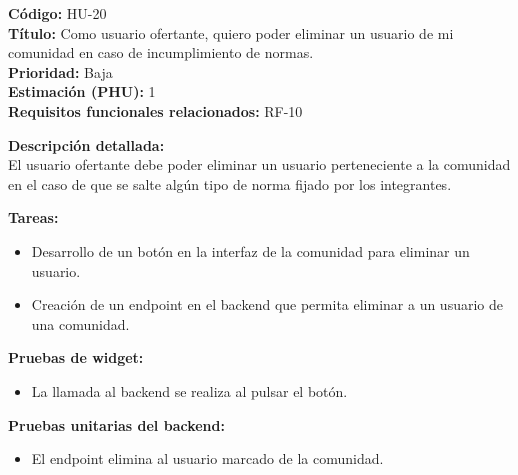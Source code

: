 \begin{tarjetaHU}
\textbf{Código:} HU-20 \\
\textbf{Título:} Como usuario ofertante, quiero poder eliminar un usuario de mi comunidad en caso de incumplimiento de normas. \\
\textbf{Prioridad:} Baja \\
\textbf{Estimación (PHU):} 1 \\
\textbf{Requisitos funcionales relacionados:} RF-10

\vspace{0.5em}
\textbf{Descripción detallada:} \\
El usuario ofertante debe poder eliminar un usuario perteneciente a la comunidad en el caso de que se salte algún tipo de norma fijado por los integrantes.

\vspace{0.5em}
\textbf{Tareas:}
\begin{itemize}[left=0pt]
  \item Desarrollo de un botón en la interfaz de la comunidad para eliminar un usuario.
  \item Creación de un endpoint en el backend que permita eliminar a un usuario de una comunidad.
\end{itemize}

\vspace{0.5em}
\textbf{Pruebas de widget:}
\begin{itemize}[left=0pt]
  \item La llamada al backend se realiza al pulsar el botón.
\end{itemize}
\textbf{Pruebas unitarias del backend:}
\begin{itemize}[left=0pt]
  \item El endpoint elimina al usuario marcado de la comunidad.
\end{itemize}

\end{tarjetaHU}

